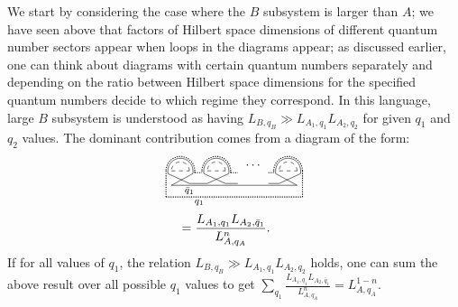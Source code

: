 \documentclass[aps,pra,reprint,superscriptaddress,twocolumn,notitlepage]{revtex4-1}
\numberwithin{equation}{section}
\begin{document}
We start by considering the case where the $B$ subsystem is larger than $A$; we have seen above that factors of Hilbert space dimensions of different quantum number sectors appear when loops in the diagrams appear; as discussed earlier, one can think about diagrams with certain quantum numbers separately and depending on the ratio between Hilbert space dimensions for the specified quantum numbers decide to which regime they correspond. In this language, large $B$ subsystem is understood as having $L_{B,q_B} \gg L_{A_1,q_1} L_{A_2,q_2}$ for given $q_1$ and $q_2$ values. The dominant contribution comes from a diagram of the form:
\begin{equation}\label{eq:renyi_negativity_large_LB}
\begin{aligned}
     &
    \tikz[scale=0.5,baseline=-1ex]{
    \draw[dashed] (0,0) -- (1,0);
    \draw (-0.2,0.)-- (-0.2,-0.15);
    \draw (-0.2,-0.15)-- (1.,-0.7);
    \draw (1.2,-0.15)-- (1.2,0.);
    \draw (1.2,-0.15)-- (0,-0.8);
    \draw[densely dotted,thick] (-0.3,0)-- (-0.3,-1.45);
    \draw[densely dotted,thick] (1.3,-0.1)-- (1.3,0.);
    \draw[dashed] (2,0) -- (3,0);
    \draw (1.8,0.)-- (1.8,-0.15);
    \draw (1.8,-0.15)-- (3.,-0.7);
    \draw (3.2,-0.15)-- (3.2,0.);
    \draw (3.2,-0.15)-- (2,-0.7);
    \draw[densely dotted,thick] (1.7,0.)-- (1.7,-0.1);
    \draw[densely dotted,thick] (3.3,-0.1)-- (3.3,0.);
    \draw[dashed] (6,0) -- (7,0);
    \draw (5.8,0.)-- (5.8,-0.15);
    \draw (5.8,-0.15)-- (7.,-0.8);
    \draw (7.2,-0.15)-- (7.2,0.);
    \draw (7.2,-0.15)-- (6,-0.7);
    \draw (5.4,-0.7)-- (6,-0.7);
    \draw[densely dotted,thick] (5.7,0.)-- (5.7,-0.1);
    \draw[densely dotted,thick] (5.4,-0.1)-- (5.7,-0.1);
    \draw[densely dotted,thick] (7.3,-1.45)-- (7.3,0.);
    \draw[densely dotted,thick] (1.3,-0.1)--(1.7,-0.1);
    \draw[densely dotted,thick](3.3,-0.1)--(3.7,-0.1);
    \draw[densely dotted,thick](-0.3,-1.45)--(7.3,-1.45);
    \draw (3,-0.7)--(3.7,-0.7);
    \draw (0,-0.8)--(7.,-0.8);
    \draw (1.0,-0.7)-- (2,-0.7);
    \draw[densely dotted,thick] (1.3,0) arc (0:180:0.8);
    \draw[densely dotted,thick] (3.3,0) arc (0:180:0.8);
    \draw[densely dotted,thick] (7.3,0) arc (0:180:0.8);
    \draw[dashed] (1.0,0) arc (0:180:0.5);
    \draw[dashed] (3.0,0) arc (0:180:0.5);
    \draw[dashed] (7.0,0) arc (0:180:0.5);
    \draw (1.2,0) arc (0:180:0.7);
    \draw (3.2,0) arc (0:180:0.7);
    \draw (7.2,0) arc (0:180:0.7);
    \node[] at (4.6,0.3) {$\cdots$};
    \draw (1.55,-1.75) circle (0.) node[anchor=center] {\scriptsize$q_1$};
    \draw (1.,-1.1) circle (0.) node[anchor=center] {\scriptsize$\bar{q}_1$};
    } \\
    & \quad = %
    \frac{L_{A_1,q_1} L_{A_2,\bar{q}_1}}{L_{A,q_A}^n}.  %
\end{aligned}
\end{equation}
If for all values of $q_1$, the relation $L_{B,q_B} \gg L_{A_1,q_1} L_{A_2,q_2}$ holds, one can sum the above result over all possible $q_1$ values to get $\sum_{q_1}
    \frac{L_{A_1,q_1} L_{A_2,\bar{q}_1}}{L_{A,q_A}^n} =L_{A,q_A}^{1-n}$.
\end{document}
